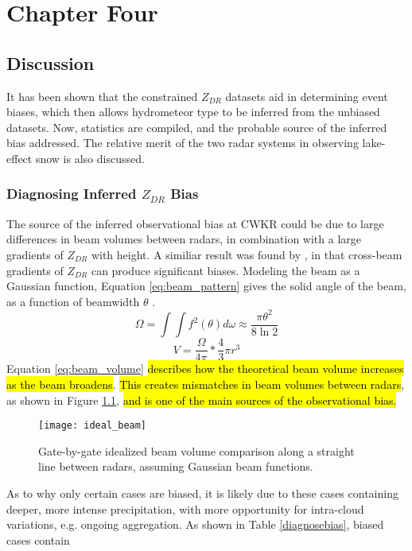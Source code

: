 \chapter{Chapter Four}
\section{Discussion}
It has been shown that the constrained $Z_{DR}$ datasets aid in determining event biases, which then allows hydrometeor type to be inferred from the unbiased
datasets. Now, statistics are compiled, and the probable source of the inferred bias addressed. The relative merit of the two radar systems in observing
lake-effect snow is also discussed.
\subsection{Diagnosing Inferred $Z_{DR}$ Bias}
The source of the inferred observational bias at CWKR could be due to large differences in beam volumes between radars, in combination with a large gradients of $Z_{DR}$ with height. A similiar result was found by \citep{Ryzhkov2007a}, in that cross-beam gradients of $Z_{DR}$ can produce significant biases. Modeling the beam as a Gaussian function, Equation \ref{eq:beam_pattern} gives the solid angle of the beam, as a function of beamwidth $\theta$ \citep{Probert1962}. 
\begin{equation}\label{eq:beam_pattern}
\Omega = \int \int f^{2}(\theta) d\omega \approx \frac{\pi \theta^{2}}{8 \ln 2}
\end{equation}
\begin{equation}\label{eq:beam_volume}
V = \frac{\Omega}{4\pi} * \frac{4}{3} \pi r^{3}
\end{equation}
Equation \ref{eq:beam_volume} \hl{describes how the theoretical beam volume increases as the beam broadens}. \hl{This creates mismatches in beam volumes between radars}, as shown in Figure \ref{fig:ideal_beam}, \hl{and is one of the main sources of the observational bias.}
\begin{figure}[H]
\centering
\texttt{[image: ideal\_beam]}
\caption{Gate-by-gate idealized beam volume comparison along a straight line between radars, assuming Gaussian beam functions.} 
\label{fig:ideal_beam}
\end{figure}
As to why only certain cases are biased, it is likely due to these cases containing deeper, more intense 
precipitation, with more opportunity for intra-cloud variations, e.g. ongoing aggregation. As shown in Table \ref{diagnosebias}, biased cases contain

